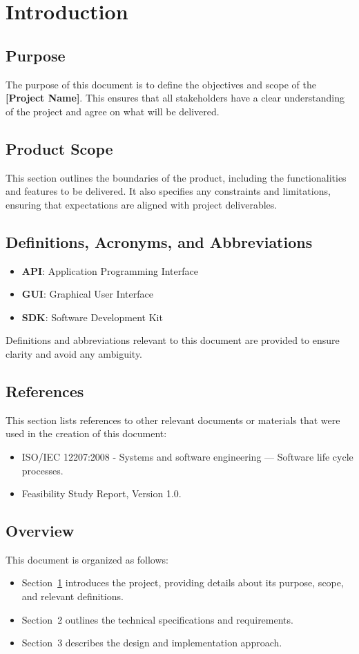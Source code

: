 \chapter{Introduction}
\label{ch:intro}

\section{Purpose}
The purpose of this document is to define the objectives and scope of the \textbf{[Project Name]}. This ensures that all stakeholders have a clear understanding of the project and agree on what will be delivered.


\section{Product Scope}
This section outlines the boundaries of the product, including the functionalities and features to be delivered. It also specifies any constraints and limitations, ensuring that expectations are aligned with project deliverables.

\section{Definitions, Acronyms, and Abbreviations}
\begin{itemize}
    \item \textbf{API}: Application Programming Interface
    \item \textbf{GUI}: Graphical User Interface
    \item \textbf{SDK}: Software Development Kit
\end{itemize}
Definitions and abbreviations relevant to this document are provided to ensure clarity and avoid any ambiguity.

\section{References}
This section lists references to other relevant documents or materials that were used in the creation of this document:
\begin{itemize}
    \item ISO/IEC 12207:2008 - Systems and software engineering — Software life cycle processes.
    \item Feasibility Study Report, Version 1.0.
\end{itemize}

\section{Overview}
This document is organized as follows:
\begin{itemize}
    \item Section~\ref{ch:intro} introduces the project, providing details about its purpose, scope, and relevant definitions.
    \item Section~2 outlines the technical specifications and requirements.
    \item Section~3 describes the design and implementation approach.
\end{itemize}

